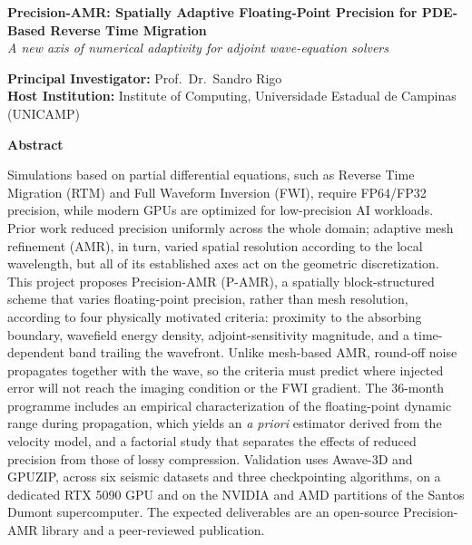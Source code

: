 \documentclass[12pt,a4paper]{article}
\newcommand{\pamr}{P\nobreakdash-AMR}
\begin{document}
\begin{otherlanguage}{brazilian}
\end{otherlanguage}

\newpage

\thispagestyle{empty}

\begin{center}
{\large\bfseries Precision-AMR: Spatially Adaptive Floating-Point Precision
for PDE-Based Reverse Time Migration}\\[0.6em]
{\itshape A new axis of numerical adaptivity for adjoint wave-equation
solvers}
\end{center}

\vspace{1.5em}

\begin{flushleft}
\textbf{Principal Investigator:} Prof.\ Dr.\ Sandro Rigo\\
\textbf{Host Institution:} Institute of Computing, Universidade Estadual de
Campinas (UNICAMP)
\end{flushleft}

\vspace{1.5em}

\noindent\textbf{Abstract}

\vspace{0.5em}

Simulations based on partial differential equations, such as Reverse Time
Migration (RTM) and Full Waveform Inversion (FWI), require FP64/FP32
precision, while modern GPUs are optimized for low-precision AI workloads.
Prior work reduced precision uniformly across the whole domain; adaptive
mesh refinement (AMR), in turn, varied spatial resolution according to the
local wavelength, but all of its established axes act on the geometric
discretization. This project proposes Precision-AMR (\pamr{}), a spatially
block-structured scheme that varies floating-point precision, rather than
mesh resolution, according to four physically motivated criteria: proximity
to the absorbing boundary, wavefield energy density, adjoint-sensitivity
magnitude, and a time-dependent band trailing the wavefront. Unlike
mesh-based AMR, round-off noise propagates together with the wave, so the
criteria must predict where injected error will not reach the imaging
condition or the FWI gradient. The 36-month programme includes an empirical
characterization of the floating-point dynamic range during propagation,
which yields an \emph{a priori} estimator derived from the velocity model,
and a factorial study that separates the effects of reduced precision from
those of lossy compression. Validation uses Awave-3D and GPUZIP, across six
seismic datasets and three checkpointing algorithms, on a dedicated RTX 5090
GPU and on the NVIDIA and AMD partitions of the Santos Dumont
supercomputer. The expected deliverables are an open-source Precision-AMR
library and a peer-reviewed publication.
\end{document}
